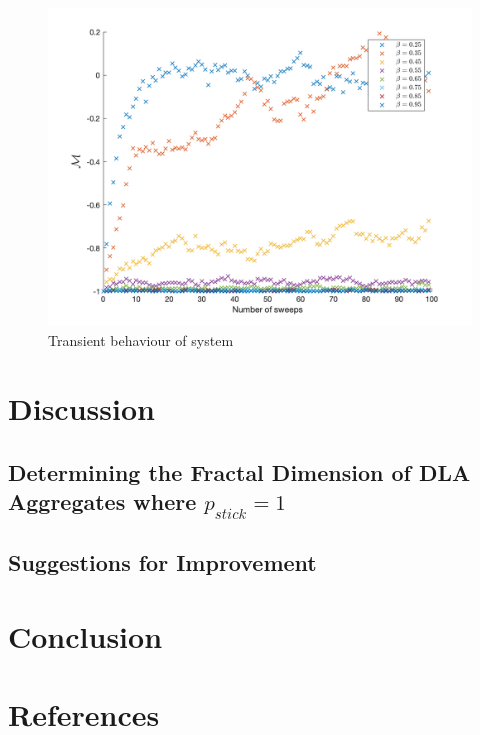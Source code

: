 \documentclass[11pt]{iopart}
\begin{document}
\begin{figure}[t]
  \centering
  \includegraphics[width=\linewidth]{images/section2/transients.png}
  \caption{Transient behaviour of system}
  \label{fig:transients}
\end{figure}

\section{Discussion}
\subsection{Determining the Fractal Dimension of DLA Aggregates where $p_{stick} = 1$}
\subsection{Suggestions for Improvement}


\section{Conclusion}

\section*{References}


\end{document}
